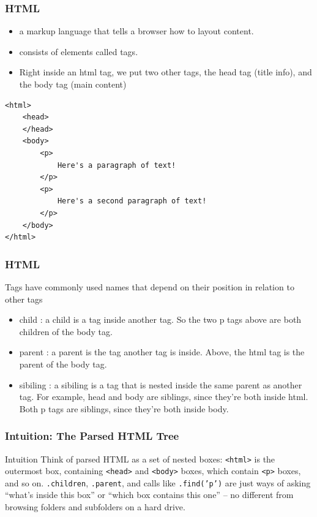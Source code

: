 \begin{frame}[fragile]\frametitle{HTML}

    \begin{itemize}
    \item  a markup language that tells a browser how to layout content.
    \item consists of elements called tags. 
    \item Right inside an html tag, we put two other tags, the head tag (title info), and the body tag (main content) 
    \end{itemize}
\begin{lstlisting}
<html>
    <head>
    </head>
    <body>
        <p>
            Here's a paragraph of text!
        </p>
        <p>
            Here's a second paragraph of text!
        </p>
    </body>
</html>
\end{lstlisting}
\end{frame}

\begin{frame}[fragile]\frametitle{HTML}
Tags have commonly used names that depend on their position in relation to other tags
    \begin{itemize}
    \item  
    child : a child is a tag inside another tag. So the two p tags above are both children of the body tag.
    \item    parent : a parent is the tag another tag is inside. Above, the html tag is the parent of the body tag.
    \item   sibiling : a sibiling is a tag that is nested inside the same parent as another tag. For example, head and body are siblings, since they're both inside html. Both p tags are siblings, since they're both inside body.

    \end{itemize}
\end{frame}

\begin{frame}[fragile]\frametitle{Intuition: The Parsed HTML Tree}
\begin{block}{Intuition}
Think of parsed HTML as a set of nested boxes: \texttt{<html>} is the outermost box, containing
\texttt{<head>} and \texttt{<body>} boxes, which contain \texttt{<p>} boxes, and so on.
\texttt{.children}, \texttt{.parent}, and calls like \texttt{.find('p')} are just ways of asking
``what's inside this box'' or ``which box contains this one'' -- no different from browsing
folders and subfolders on a hard drive.
\end{block}
\end{frame}

